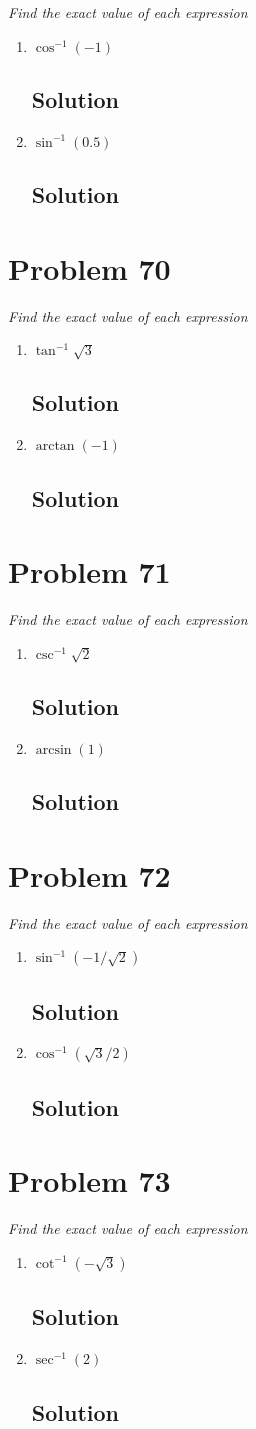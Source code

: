 \documentclass[11pt]{article}
\newcommand{\soln}{\subsection*}
\newcommand{\qn}{\textit}
\begin{document}
\qn{Find the exact value of each expression}
\begin{enumerate}
	\item \qn{$\cos^{-1}(-1)$}
	\soln{Solution}
	
	\item \qn{$\sin^{-1}(0.5)$}
	\soln{Solution}
\end{enumerate}

\section*{Problem 70}

\qn{Find the exact value of each expression}
\begin{enumerate}
	\item \qn{$\tan^{-1}\sqrt{3}$}
	\soln{Solution}
	
	\item \qn{$\arctan(-1)$}
	\soln{Solution}
\end{enumerate}

\section*{Problem 71}

\qn{Find the exact value of each expression}
\begin{enumerate}
	\item \qn{$\csc^{-1}\sqrt{2}$}
	\soln{Solution}
	
	\item \qn{$\arcsin(1)$}
	\soln{Solution}
\end{enumerate}

\section*{Problem 72}

\qn{Find the exact value of each expression}
\begin{enumerate}
	\item \qn{$\sin^{-1}(-1/\sqrt{2})$}
	\soln{Solution}
	
	\item \qn{$\cos^{-1}(\sqrt{3}/2)$}
	\soln{Solution}
\end{enumerate}

\section*{Problem 73}

\qn{Find the exact value of each expression}
\begin{enumerate}
	\item \qn{$\cot^{-1}(-\sqrt{3})$}
	\soln{Solution}
	
	\item \qn{$\sec^{-1}(2)$}
	\soln{Solution}
\end{enumerate}
\end{document}
